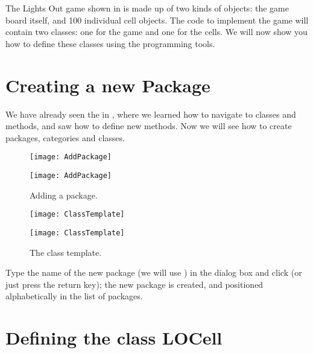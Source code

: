 \documentclass[a4paper,10pt,twoside]{book}
\begin{document}
The Lights Out game shown in  is made up of two kinds of objects: the game board itself, and 100 individual cell objects.  The \pharo code to implement the game will contain two classes: one for the game and one for the cells.
We will now show you how to define these classes using the \pharo programming tools.

\section{Creating a new Package}

We have already seen the  in , where we learned how to navigate to classes and methods, and saw how to define new methods.
Now we will see how to create packages, categories and classes.


\begin{figure}[htb]
\begin{minipage}[b]{0.48\textwidth}
\ifluluelse
	{\centerline {\texttt{[image: AddPackage]}}}
	{\centerline {\texttt{[image: AddPackage]}}}
	\caption{Adding a package.
	}
\end{minipage}
\hfill
\begin{minipage}[b]{0.48\textwidth}
\ifluluelse
	{\centerline {\texttt{[image: ClassTemplate]}}}
	{\centerline {\texttt{[image: ClassTemplate]}}}
	\caption{The class template.
	}
\end{minipage}
\end{figure}

Type the name of the new package (we will use ) in the dialog box and click  (or just press the return key); the new package is created, and positioned alphabetically in the list of packages.

\section{Defining the class LOCell}
\end{document}
